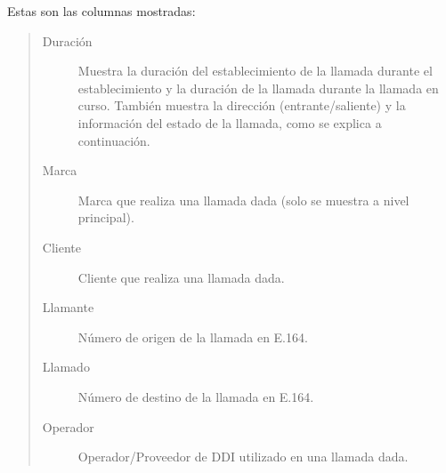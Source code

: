 \documentclass[letterpaper,10pt,spanish]{sphinxmanual}
\begin{document}
Estas son las columnas mostradas:
\begin{quote}
\begin{description}
\item[{Duración}] \leavevmode
Muestra la duración del establecimiento de la llamada durante el establecimiento y la duración de la llamada durante la llamada en curso. También muestra la dirección (entrante/saliente) y la información del estado de la llamada, como se explica a continuación.

\item[{Marca}] \leavevmode
Marca que realiza una llamada dada (solo se muestra a nivel principal).

\item[{Cliente}] \leavevmode
Cliente que realiza una llamada dada.

\item[{Llamante}] \leavevmode
Número de origen de la llamada en E.164.

\item[{Llamado}] \leavevmode
Número de destino de la llamada en E.164.

\item[{Operador}] \leavevmode
Operador/Proveedor de DDI utilizado en una llamada dada.

\end{description}
\end{quote}
\end{document}
